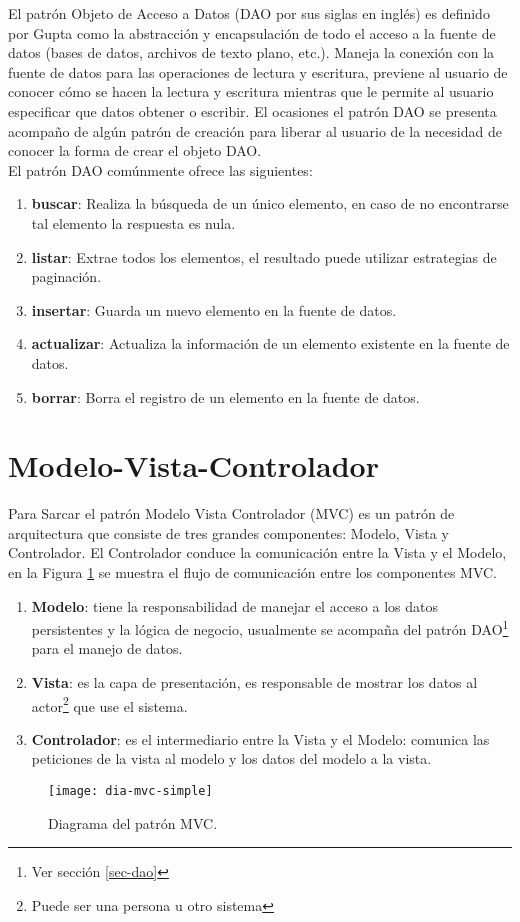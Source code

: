 El patrón Objeto de Acceso a Datos (DAO por sus siglas en inglés) es definido por Gupta\cite{OCPJavaSE7} como la abstracción y encapsulación de todo el acceso a la fuente de datos (bases de datos, archivos de texto plano, etc.). Maneja la conexión con la fuente de datos para las operaciones de lectura y escritura, previene al usuario de conocer cómo se hacen la lectura y escritura mientras que le permite al usuario especificar que datos obtener o escribir.
El ocasiones el patrón DAO se presenta acompaño de algún patrón de creación para liberar al usuario de la necesidad de conocer la forma de crear el objeto DAO\cite{OCPJavaSE7}\cite{OCAPJavaSE7}.\\
El patrón DAO comúnmente ofrece las siguientes:
\begin{enumerate}
	\item [] \textbf{buscar}: Realiza la búsqueda de un único elemento, en caso de no encontrarse tal elemento la respuesta es nula.
	\item [] \textbf{listar}: Extrae todos los elementos, el resultado puede utilizar estrategias de paginación.
	\item [] \textbf{insertar}: Guarda un nuevo elemento en la fuente de datos.
	\item [] \textbf{actualizar}: Actualiza la información de un elemento existente en la fuente de datos.
	\item [] \textbf{borrar}: Borra el registro de un elemento en la fuente de datos.
\end{enumerate}


\section{Modelo-Vista-Controlador}\label{sec-mvc}
Para Sarcar\cite{JavaDesignPatternsExamples} el patrón Modelo Vista Controlador (MVC) es un patrón de arquitectura que consiste de tres grandes componentes: Modelo, Vista y Controlador. El Controlador conduce la comunicación entre la Vista y el Modelo, en la Figura \ref{fig:dia-mvc-simple} se muestra el flujo de comunicación entre los componentes MVC.
\begin{enumerate}
	\item \textbf{Modelo}: tiene la responsabilidad de manejar el acceso a los datos persistentes y la lógica de negocio, usualmente se acompaña del patrón DAO\footnote{Ver sección \ref{sec-dao}} para el manejo de datos.
	\item \textbf{Vista}: es la capa de presentación, es responsable de mostrar los datos al actor\footnote{Puede ser una persona u otro sistema} que use el sistema.
	\item \textbf{Controlador}: es el intermediario entre la Vista y el Modelo: comunica las peticiones de la vista al modelo y los datos del modelo a la vista.
\end{enumerate}
\begin{figure}[h]
  \centering
  \texttt{[image: dia-mvc-simple]}
  \caption{Diagrama del patrón MVC.}
  \label{fig:dia-mvc-simple}
\end{figure}
